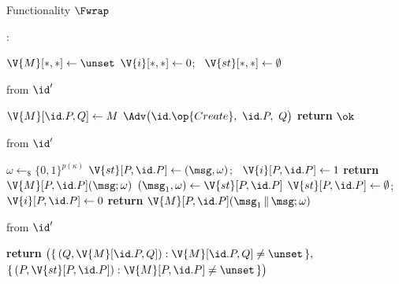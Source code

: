 \begin{interface}[nofloat]{Functionality $\Fwrap$ \\
}

{\scriptsize
\setlength{\columnsep}{1.4em}
\begin{multicols}{2}
:
\begin{algorithmic}[1]
\setcounter{contline}{0}\algcont
\State $\V{M}[*,*] \gets \unset$
\State $\V{i}[*,*] \gets 0$; \ $\V{st}[*,*] \gets \emptyset$
\algsave
\end{algorithmic}
\vspace{1.4ex}

 \quad from $\id'$
\begin{algorithmic}[1]
\algcont
{} \label{ln:wraponce}
\State $\V{M}[\id.P, Q] \gets M$ \label{ln:wrapseal}
\State $\Adv\bigl(\id.\op{Create},\ \id.P,\ Q\bigr)$ \label{ln:wrapnotify}
\State \textbf{return} $\ok$
\algsave
\end{algorithmic}
\vspace{1.4ex}

 \quad from $\id'$
\begin{algorithmic}[1]
\algcont
{} \label{ln:wrapmine}
  \State $\omega \gets_{\$} \{0,1\}^{p(\kappa)}$ \label{ln:wrapcoins}
  \State $\V{st}[P, \id.P] \gets (\msg, \omega)$; \ $\V{i}[P, \id.P] \gets 1$
  \State \textbf{return} $\V{M}[P, \id.P](\msg; \omega)$ \label{ln:wrapfirst}
\EndIf
\State $(\msg_{1}, \omega) \gets \V{st}[P, \id.P]$
\State $\V{st}[P, \id.P] \gets \emptyset$; \ $\V{i}[P, \id.P] \gets 0$ \label{ln:wrapreset}
\State \textbf{return} $\V{M}[P, \id.P](\msg_{1} \,\|\, \msg; \omega)$ \label{ln:wrapsecond}
\algsave
\end{algorithmic}
\vspace{1.4ex}

\columnbreak

 \quad from $\id'$
\begin{algorithmic}[1]
\algcont
\State \textbf{return} $\bigl(\{\, (Q, \V{M}[\id.P, Q]) : \V{M}[\id.P, Q] \neq \unset \,\},$
\Statex \quad\ $\{\, (P, \V{st}[P, \id.P]) : \V{M}[P, \id.P] \neq \unset \,\}\bigr)$ \label{ln:wrapleak}
\algsave
\end{algorithmic}
\end{multicols}}
\end{interface}
